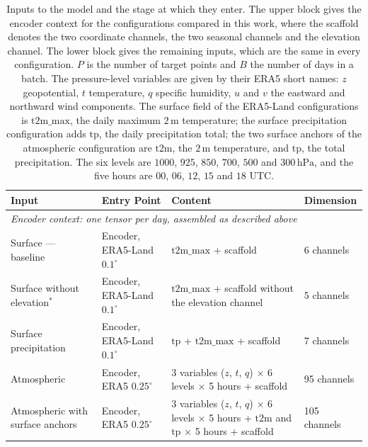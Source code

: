 \begin{table}[htbp]
    \centering
    \caption[Model inputs and where they enter]{Inputs to the model and the stage at which they enter. The upper block gives the encoder context for the configurations compared in this work, where the scaffold denotes the two coordinate channels, the two seasonal channels and the elevation channel. The lower block gives the remaining inputs, which are the same in every configuration. $P$ is the number of target points and $B$ the number of days in a batch. The pressure-level variables are given by their ERA5 short names: $z$ geopotential, $t$ temperature, $q$ specific humidity, $u$ and $v$ the eastward and northward wind components. The surface field of the ERA5-Land configurations is $\mathrm{t2m\_max}$, the daily maximum $2\,\mathrm{m}$ temperature; the surface precipitation configuration adds $\mathrm{tp}$, the daily precipitation total; the two surface anchors of the atmospheric configuration are $\mathrm{t2m}$, the $2\,\mathrm{m}$ temperature, and $\mathrm{tp}$, the total precipitation. The six levels are $1000$, $925$, $850$, $700$, $500$ and $300\,\mathrm{hPa}$, and the five hours are $00$, $06$, $12$, $15$ and $18$ UTC.}
    \label{tab:data-context}
    \footnotesize
    \begin{tabular}{|p{3.2cm}|p{2.8cm}|p{4.6cm}|p{2.1cm}|}
        \hline
        \textbf{Input} & \textbf{Entry Point} & \textbf{Content} & \textbf{Dimension} \\
        \hline
        \multicolumn{4}{|l|}{\textit{Encoder context: one tensor per day, assembled as described above}} \\
        \hline
        Surface --- baseline & Encoder, ERA5-Land $0.1^{\circ}$ & $\mathrm{t2m\_max}$ + scaffold & 6 channels \\
        \hline
        Surface without elevation$^{*}$ & Encoder, ERA5-Land $0.1^{\circ}$ & $\mathrm{t2m\_max}$ + scaffold without the elevation channel & 5 channels \\
        \hline
        Surface precipitation & Encoder, ERA5-Land $0.1^{\circ}$ & $\mathrm{tp}$ + $\mathrm{t2m\_max}$ + scaffold & 7 channels \\
        \hline
        Atmospheric & Encoder, ERA5 $0.25^{\circ}$ & 3 variables ($z$, $t$, $q$) $\times$ 6 levels $\times$ 5 hours + scaffold & 95 channels \\
        \hline
        Atmospheric with surface anchors & Encoder, ERA5 $0.25^{\circ}$ & 3 variables ($z$, $t$, $q$) $\times$ 6 levels $\times$ 5 hours + $\mathrm{t2m}$ and $\mathrm{tp}$ $\times$ 5 hours + scaffold & 105 channels \\

\end{tabular}
\end{table}
